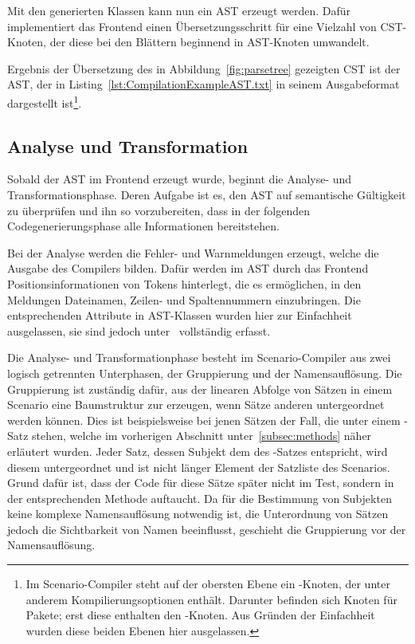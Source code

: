 Mit den generierten Klassen kann nun ein AST erzeugt werden.
Dafür implementiert das Frontend einen Übersetzungsschritt für eine Vielzahl von CST-Knoten, der diese bei den Blättern beginnend in AST-Knoten umwandelt.

Ergebnis der Übersetzung des in Abbildung~\ref{fig:parsetree} gezeigten CST ist der AST, der in Listing~\ref{lst:CompilationExampleAST.txt} in seinem Ausgabeformat dargestellt ist\footnote{
    Im Scenario-Compiler steht auf der obersten Ebene ein -Knoten, der unter anderem Kompilierungsoptionen enthält.
    Darunter befinden sich Knoten für Pakete;
    erst diese enthalten den -Knoten.
    Aus Gründen der Einfachheit wurden diese beiden Ebenen hier ausgelassen.
}.


\subsection{Analyse und Transformation}\label{subsec:data-model-gentreesrc}

Sobald der AST im Frontend erzeugt wurde, beginnt die Analyse- und Transformationsphase.
Deren Aufgabe ist es, den AST auf semantische Gültigkeit zu überprüfen und ihn so vorzubereiten, dass in der folgenden Codegenerierungsphase alle Informationen bereitstehen.

Bei der Analyse werden die Fehler- und Warnmeldungen erzeugt, welche die Ausgabe des Compilers bilden.
Dafür werden im AST durch das Frontend Positionsinformationen von Tokens hinterlegt, die es ermöglichen, in den Meldungen Dateinamen, Zeilen- und Spaltennummern einzubringen.
Die entsprechenden Attribute in AST-Klassen wurden hier zur Einfachheit ausgelassen, sie sind jedoch unter~\cite{gts-definitions} vollständig erfasst.

Die Analyse- und Transformationphase besteht im Scenario-Compiler aus zwei logisch getrennten Unterphasen, der Gruppierung und der Namensauflösung.
Die Gruppierung ist zuständig dafür, aus der linearen Abfolge von Sätzen in einem Scenario eine Baumstruktur zur erzeugen, wenn Sätze anderen untergeordnet werden können.
Dies ist beispielsweise bei jenen Sätzen der Fall, die unter einem -Satz stehen, welche im vorherigen Abschnitt unter~\ref{subsec:methods} näher erläutert wurden.
Jeder Satz, dessen Subjekt dem des -Satzes entspricht, wird diesem untergeordnet und ist nicht länger Element der Satzliste des Scenarios.
Grund dafür ist, dass der Code für diese Sätze später nicht im Test, sondern in der entsprechenden Methode auftaucht.
Da für die Bestimmung von Subjekten keine komplexe Namensauflösung notwendig ist, die Unterordnung von Sätzen jedoch die Sichtbarkeit von Namen beeinflusst, geschieht die Gruppierung vor der Namensauflösung.

